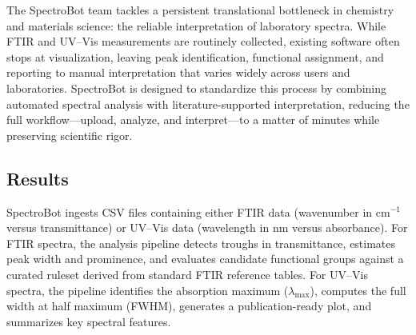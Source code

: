 %

The SpectroBot team tackles a persistent translational bottleneck in chemistry and materials science: the reliable interpretation of laboratory spectra. While FTIR and UV--Vis measurements are routinely collected, existing software often stops at visualization, leaving peak identification, functional assignment, and reporting to manual interpretation that varies widely across users and laboratories. SpectroBot is designed to standardize this process by combining automated spectral analysis with literature-supported interpretation, reducing the full workflow—upload, analyze, and interpret—to a matter of minutes while preserving scientific rigor.


\subsection*{Results}

SpectroBot ingests CSV files containing either FTIR data (wavenumber in cm$^{-1}$ versus transmittance) or UV--Vis data (wavelength in nm versus absorbance). For FTIR spectra, the analysis pipeline detects troughs in transmittance, estimates peak width and prominence, and evaluates candidate functional groups against a curated ruleset derived from standard FTIR reference tables. For UV--Vis spectra, the pipeline identifies the absorption maximum ($\lambda_{\max}$), computes the full width at half maximum (FWHM), generates a publication-ready plot, and summarizes key spectral features.

